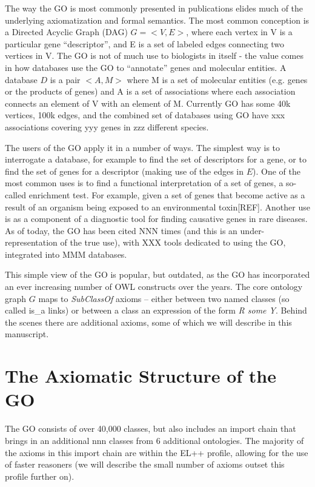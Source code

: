 \documentclass{llncs}
\begin{document}
The way the GO is most commonly presented in publications elides much
of the underlying axiomatization and formal semantics. The most common
conception is a Directed Acyclic Graph (DAG) $G = <V,E>$, where each
vertex in V is a particular gene ``descriptor'', and E is a set of
labeled edges connecting two vertices in V. The GO is not of much use
to biologists in itself - the value comes in how databases use the GO
to ``annotate'' genes and molecular entities.  A database $D$ is a
pair $<A, M>$ where M is a set of molecular entities (e.g. genes or
the products of genes) and A is a set of associations where each
association connects an element of V with an element of M. Currently
GO has some 40k vertices, 100k edges, and the combined set of databases
using GO have xxx associations covering yyy genes in zzz different
species\cite{Blake2013}.


The users of the GO apply it in a number of ways. The simplest way is
to interrogate a database, for example to find the set of descriptors
for a gene, or to find the set of genes for a descriptor (making use
of the edges in $E$). One of the most common uses is to find a
functional interpretation of a set of genes, a so-called enrichment
test. For example, given a set of genes that become active as a result
of an organism being exposed to an environmental toxin[REF]. Another
use is as a component of a diagnostic tool for finding causative genes
in rare diseases\cite{Phevor}. As of today, the GO has been cited NNN
times (and this is an under-representation of the true use), with XXX
tools dedicated to using the GO, integrated into MMM databases.

This simple view of the GO is popular, but outdated, as the GO
has incorporated an ever increasing number of OWL constructs over the
years. The core ontology graph $G$ maps to \emph{SubClassOf} axioms --
either between two named classes (so called is\_a links) or between a
class an expression of the form \emph{R some Y}. Behind the scenes
there are additional axioms, some of which we will describe in this
manuscript.

\section{The Axiomatic Structure of the GO}


The GO consists of over 40,000 classes, but also includes an import
chain that brings in an additional nnn classes from 6 additional
ontologies. The majority of the axioms in this import chain are within
the EL++ profile, allowing for the use of faster reasoners (we will
describe the small number of axioms outset this profile further on).
\end{document}
